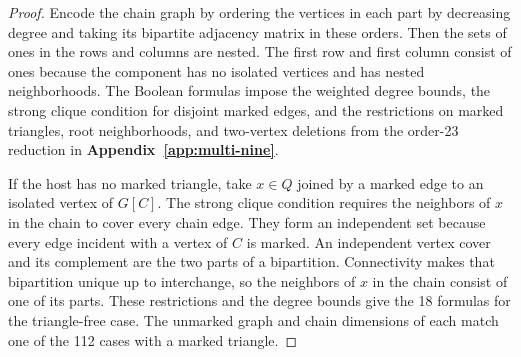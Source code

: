 \documentclass[preprint,11pt,numbers]{elsarticle-arxiv}
\numberwithin{equation}{section}
\theoremstyle{definition}
\begin{document}
\begin{proof}
Encode the chain graph by ordering the vertices in each part
by decreasing degree and taking its bipartite adjacency matrix
in these orders. Then the sets of ones in the rows and columns
are nested. The first row and first column consist of ones
because the component has no isolated vertices and has nested
neighborhoods. The Boolean formulas impose the weighted degree
bounds, the strong clique condition for disjoint marked edges,
and the restrictions on marked triangles, root neighborhoods,
and two-vertex deletions from the order-23 reduction in
\textbf{Appendix~\ref{app:multi-nine}}.

If the host has no marked triangle, take $x\in Q$ joined by a
marked edge to an isolated vertex of $G[C]$. The strong clique
condition requires the neighbors of $x$ in the chain to cover
every chain edge. They form an independent set because every
edge incident with a vertex of $C$ is marked. An independent
vertex cover and its complement are the two parts of a
bipartition. Connectivity makes that bipartition unique up
to interchange, so the neighbors of $x$ in the chain consist
of one of its parts. These restrictions and the degree bounds
give the 18 formulas for the triangle-free case. The unmarked
graph and chain dimensions of each match one of the 112 cases
with a marked triangle.


\end{proof}
\end{document}
